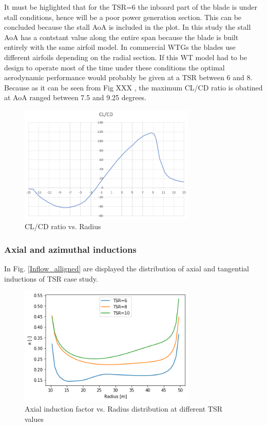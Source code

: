 It must be higlighted that for the TSR=6 the inboard part of the blade is under stall conditions, hence will be a poor power generation section. This can be concluded because the stall AoA is included in the plot. In this study the stall AoA has a contstant value along the entire span because the blade is built entirely with the same airfoil model. In commercial WTGs the blades use different airfoils depending on the radial section. If this WT model had to be design to operate most of the time under these conditions the optimal aerodynamic performance would probably be given at a TSR between 6 and 8. Because as it can be seen from Fig XXX , the maximum CL/CD ratio is obatined at AoA ranged between 7.5 and 9.25 degrees.

\begin{figure}[htbp]
\includegraphics[width=0.75\textwidth]{./img/CL_CD_plt.png}
\caption{CL/CD ratio vs. Radius }
\centering
\label{CL_CD_alligned}
\end{figure}


\subsubsection{\textbf{Axial and azimuthal inductions}  }

In Fig. \ref{Inflow_alligned} are displayed the distribution of axial and tangential inductions of TSR case study. 

\begin{figure}[htbp]
\includegraphics[width=0.75\textwidth]{./img/a_plt_alligned.png}
\caption{Axial induction factor vs. Radius distribution at different TSR values}
\centering
\label{a_alligned}
\end{figure}

